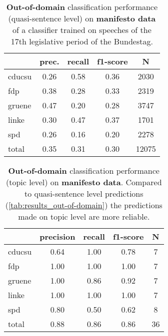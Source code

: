 \documentclass[11pt]{article}
\begin{document}
\begin{table}[t]
\caption{
\label{tab:results_out-of-domain}
{\bf Out-of-domain} classification performance (quasi-sentence level) on {\bf manifesto data} of a classifier trained on speeches of the 17th legislative period of the Bundestag.
}

\begin{center}
\begin{tabular}{lcccc}
    &         prec.    &recall &  f1-score  & N  \\
\hline \hline
    cducsu    &   0.26   &   0.58   &   0.36    &   2030 \\
    fdp    &   0.38   &   0.28   &   0.33    &   2319 \\
     gruene   &    0.47    &  0.20   &   0.28    &  3747\\
      linke     &  0.30  &    0.47    &  0.37    &   1701\\
        spd     &  0.26  &    0.16   &   0.20    &   2278\\
\hline
total    &   0.35  &    0.31  &    0.30   &   12075\\
%
\end{tabular}
\end{center}

\end{table}

\begin{table}[t]
\caption{
\label{tab:results_topic}
{\bf Out-of-domain} classification performance (topic level) on {\bf manifesto data}. Compared to quasi-sentence level predictions (\autoref{tab:results_out-of-domain}) the predictions made on topic level are more reliable.}
\begin{center}
\begin{tabular}{lcccc}
    &         precision    &recall &  f1-score  & N  \\
    \hline
        \hline
cducsu     &  0.64  &    1.00  &    0.78    &     7\\
       fdp    &   1.00    &  1.00    &  1.00    &     7\\
    gruene  &     1.00  &    0.86  &    0.92    &     7\\
     linke    &   1.00   &   1.00     & 1.00    &     7\\
       spd   &    0.80   &   0.50    &  0.62     &    8\\
    \hline
total  &     0.88   &   0.86   &   0.86  &      36\\
\end{tabular}
\end{center}

\end{table}
\end{document}
